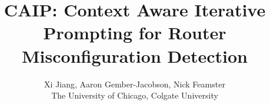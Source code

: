 \usepackage{ifluatex}

\usepackage{outlines}
\newtheorem{insight}{Insight}




\newcommand*{\affmark}[1][*]{\textsuperscript{#1}}
\newcommand*{\affaddr}[1]{#1}

\title{CAIP: Context Aware Iterative Prompting for Router Misconfiguration Detection}



\author{Xi Jiang, Aaron Gember-Jacobson, Nick Feamster \\
The University of Chicago, Colgate University}
\newcommand{\eg}{{\it e.g.}}
\newcommand{\ie}{{\it i.e.}}
\newcommand{\etal}{{\it et al.}}
\newcommand{\sysname}{{CAIP}}



\maketitle
\pagestyle{plain}








 
% 



\pagebreak



